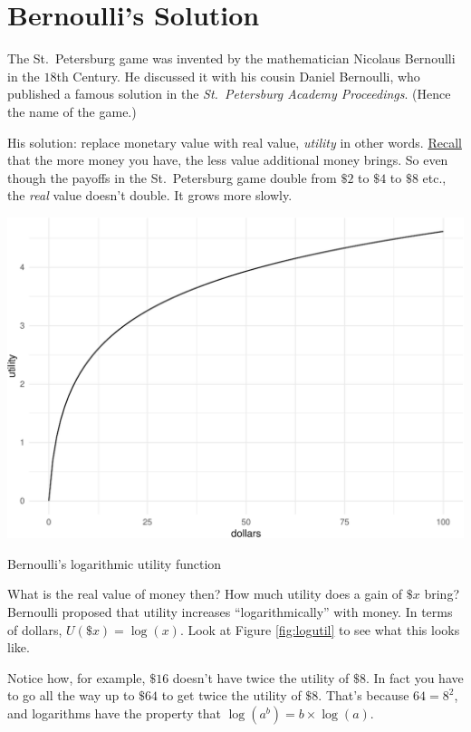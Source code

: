 \documentclass[justified]{tufte-book}
\renewcommand{\u}{U}
\theoremstyle{definition}
\theoremstyle{definition}
\theoremstyle{definition}
\theoremstyle{definition}
\theoremstyle{remark}
\begin{document}
\hypertarget{bernoullis-solution}{%
\section{Bernoulli's Solution}\label{bernoullis-solution}}

The St.~Petersburg game was invented by the mathematician Nicolaus Bernoulli in the \(18\)th Century. He discussed it with his cousin Daniel Bernoulli, who published a famous solution in the \emph{St.~Petersburg Academy Proceedings}. (Hence the name of the game.)

His solution: replace monetary value with real value, \emph{utility} in other words. \protect\hyperlink{utility}{Recall} that the more money you have, the less value additional money brings. So even though the payoffs in the St.~Petersburg game double from \(\$2\) to \(\$4\) to \(\$8\) etc., the \emph{real} value doesn't double. It grows more slowly.

\begin{marginfigure}
\includegraphics{_main_files/figure-latex/logutil-1} \caption[Bernoulli's logarithmic utility function]{Bernoulli's logarithmic utility function}\label{fig:logutil}
\end{marginfigure}

What is the real value of money then? How much utility does a gain of \(\$x\) bring? Bernoulli proposed that utility increases ``logarithmically'' with money. In terms of dollars, \(\u(\$x)=\log(x)\). Look at Figure \ref{fig:logutil} to see what this looks like.

Notice how, for example, \(\$16\) doesn't have twice the utility of \(\$8\). In fact you have to go all the way up to \(\$64\) to get twice the utility of \(\$8\). That's because \(64 = 8^2\), and logarithms have the property that \(\log(a^b) = b \times \log(a)\).
\end{document}
